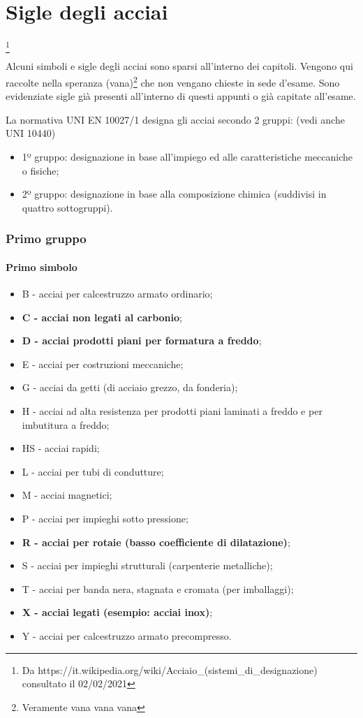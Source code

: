 
\chapter{Sigle degli acciai}\footnote{Da https://it.wikipedia.org/wiki/Acciaio\_(sistemi\_di\_designazione) consultato il 02/02/2021}

Alcuni simboli e sigle degli acciai sono sparsi all'interno dei capitoli. Vengono qui raccolte nella speranza (vana)\footnote{Veramente vana vana vana} che non vengano chieste in sede d'esame. Sono evidenziate sigle già presenti all'interno di questi appunti o già capitate all'esame.

La normativa UNI EN 10027/1 designa gli acciai secondo 2 gruppi: (vedi anche UNI 10440)
\begin{itemize}
\item 1º gruppo: designazione in base all'impiego ed alle caratteristiche meccaniche o fisiche;
\item 2º gruppo: designazione in base alla composizione chimica (suddivisi in quattro sottogruppi).
\end{itemize}
\subsection{Primo gruppo}
\subsubsection{Primo simbolo}
\begin{itemize}
    \item B - acciai per calcestruzzo armato ordinario;
    \item \textbf{C - acciai non legati al carbonio};
    \item \textbf{D - acciai prodotti piani per formatura a freddo};
    \item E - acciai per costruzioni meccaniche;
    \item G - acciai da getti (di acciaio grezzo, da fonderia);
    \item H - acciai ad alta resistenza per prodotti piani laminati a freddo e per imbutitura a freddo;
    \item HS - acciai rapidi;
    \item L - acciai per tubi di condutture;
    \item M - acciai magnetici;
    \item P - acciai per impieghi sotto pressione;
    \item \textbf{R - acciai per rotaie (basso coefficiente di dilatazione)};
    \item S - acciai per impieghi strutturali (carpenterie metalliche);
    \item T - acciai per banda nera, stagnata e cromata (per imballaggi);
    \item \textbf{X - acciai legati (esempio: acciai inox)};
    \item Y - acciai per calcestruzzo armato precompresso.
\end{itemize}

